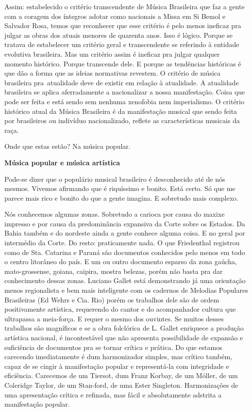 Assim: estabelecido o critério transcendente de Música Brasileira que
faz a gente com a coragem dos íntegros adotar como nacionais a Missa em
Si Bemol e Salvador Rosa, temos que reconhecer que esse critério é pelo
menos ineficaz pra julgar as obras dos atuais menores de quarenta anos.
Isso é lógico. Porque se tratava de estabelecer um critério geral e
transcendente se referindo à entidade evolutiva brasileira. Mas um
critério assim é ineficaz pra julgar qualquer momento histórico. Porque
transcende dele. E porque as tendências históricas é que dão a forma que
as ideias normativas revestem. O critério de música brasileira
pra~atualidade deve de existir em relação à atualidade. A atualidade
brasileira se aplica aferradamente a nacionalizar a nossa manifestação.
Coisa que pode ser feita e está sendo sem nenhuma xenofobia nem
imperialismo. O critério histórico atual da Música Brasileira é da
manifestação musical que sendo feita por brasileiros ou indivíduo
nacionalizado, reflete as características musicais da raça.

Onde que estas estão? Na música popular.

\textbf{Música popular e música artística}

Pode-se dizer que o populário musical brasileiro é desconhecido até de
nós mesmos. Vivemos afirmando que é riquíssimo e bonito. Está certo. Só
que me parece mais rico e bonito do que a gente imagina. E sobretudo
mais complexo.

Nós conhecemos algumas zonas. Sobretudo a carioca por causa do maxixe
impresso e por causa da predominância expansiva da Corte sobre os
Estados. Da Bahia também e do nordeste ainda a gente conhece alguma
coisa. E no geral por intermédio da Corte. Do resto: praticamente nada.
O que Friedenthal registrou como de Sta. Catarina e Paraná são
documentos conhecidos pelo menos em todo o centro litorâneo do país. E
um ou outro documento esparso da zona gaúcha, mato-grossense, goiana,
caipira, mostra belezas, porém não basta pra dar conhecimento dessas
zonas. Luciano Gallet está demonstrando já uma orientação menos
regionalista e bem mais inteligente com os cadernos de Melodias
Populares Brasileiras (Ed Wehrs e Cia. Rio) porém os trabalhos dele são
de ordem positivamente artística, requerendo do cantor e do acompanhador
cultura que ultrapassa a meia-força. E requer o mesmo dos ouvintes. Se
muitos desses trabalhos são magníficos e se a obra folclórica de L.
Gallet enriquece a produção artística nacional, é incontestável que não
apresenta possibilidade de expansão e suficiência de documentos pra se
tornar crítica e prática. Do que estamos carecendo imediatamente é dum
harmonizador simples, mas crítico também, capaz de se cingir à
manifestação popular e representá-la com integridade e eficiência.
Carecemos de um Tiersot, dum Franz Korbay, de um Möller, de um Coleridge
Taylor, de um Stan-ford, de uma Ester Singleton. Harmonizações de uma
apresentação crítica e refinada, mas fácil e absolutamente adstrita a
manifestação popular.

